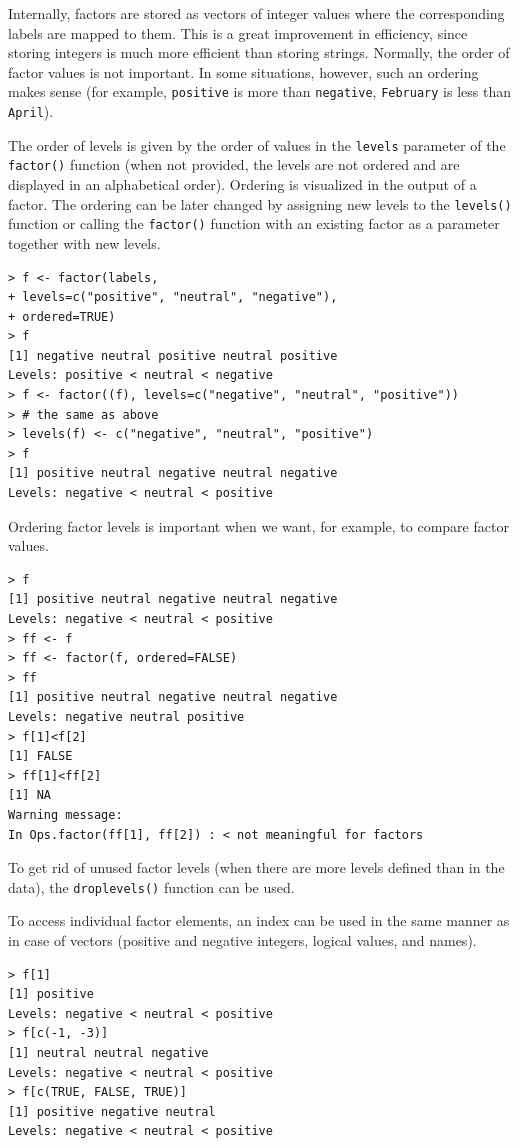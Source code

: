 Internally, factors are stored as vectors of integer values where the corresponding labels are mapped to them. This is a great improvement in efficiency,
since storing integers is much more efficient than storing strings. Normally, the
order of factor values is not important. In some situations, however, such an ordering makes sense (for example, \texttt{positive} is more than \texttt{negative}, \texttt{February}
is less than \texttt{April}).

The order of levels is given by the order of values in the \texttt{levels} parameter
of the \texttt{factor()} function (when not provided, the levels are not ordered 
and are displayed in an alphabetical order). 
Ordering is visualized in the output of a factor. 
The ordering can be later changed by assigning new levels to the 
\texttt{levels()} function or calling the \texttt{factor()} function with an existing 
factor as a parameter together with new levels.

\begin{verbatim}
> f <- factor(labels,
+ levels=c("positive", "neutral", "negative"),
+ ordered=TRUE)
> f
[1] negative neutral positive neutral positive
Levels: positive < neutral < negative
> f <- factor((f), levels=c("negative", "neutral", "positive"))
> # the same as above
> levels(f) <- c("negative", "neutral", "positive")
> f
[1] positive neutral negative neutral negative
Levels: negative < neutral < positive
\end{verbatim}

Ordering factor levels is important when we want, for example, to compare
factor values.

\begin{verbatim}
> f
[1] positive neutral negative neutral negative
Levels: negative < neutral < positive
> ff <- f
> ff <- factor(f, ordered=FALSE)
> ff
[1] positive neutral negative neutral negative
Levels: negative neutral positive
> f[1]<f[2]
[1] FALSE
> ff[1]<ff[2]
[1] NA
Warning message:
In Ops.factor(ff[1], ff[2]) : < not meaningful for factors
\end{verbatim}

To get rid of unused factor levels (when there are more levels defined than in
the data), the \texttt{droplevels()} function can be used.

To access individual factor elements, an index can be used in the same manner
as in case of vectors (positive and negative integers, logical values, and names).

\begin{verbatim}
> f[1]
[1] positive
Levels: negative < neutral < positive
> f[c(-1, -3)]
[1] neutral neutral negative
Levels: negative < neutral < positive
> f[c(TRUE, FALSE, TRUE)]
[1] positive negative neutral
Levels: negative < neutral < positive
\end{verbatim}

